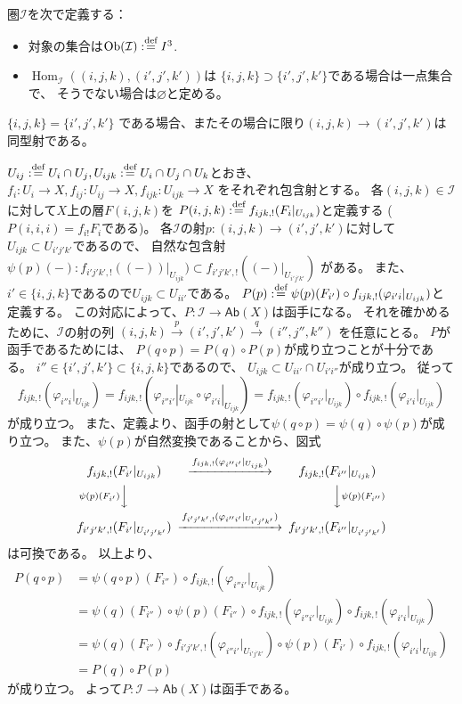 \documentclass[uplatex,dvipdfmx]{jsarticle}
\makeatletter
\theoremstyle{definition}
\renewenvironment{proof}[1][\proofname]{
  \pushQED{\qed}%
  \normalfont \topsep6\p@\@plus6\p@\relax
  \trivlist
  \item[\hskip\labelsep
    #1\@addpunct{\textbf{.}}]\ignorespaces
}{%
  \popQED\endtrivlist\@endpefalse
}
\providecommand{\proofname}{証明}
\DeclareMathOperator{\Hom}{\mathrm{Hom}}
\newcommand{\Ab}{\mathsf{Ab}}
\newcommand\mcI{\mathcal{I}}
\renewcommand{\emptyset}{\varnothing}
\def\dfn{:\overset{\mbox{{\scriptsize def}}}{=}}
\makeatother
\begin{document}
\begin{proof}
  圏\(\mcI\)を次で定義する：
  \begin{itemize}
    \item
    対象の集合は\(\mathrm{Ob}(\mcI) \dfn I^3\).
    \item
    \(\Hom_{\mcI}((i,j,k),(i',j',k'))\)は
    \(\{i,j,k\} \supset \{i',j',k'\}\)である場合は一点集合で、
    そうでない場合は\(\emptyset\)と定める。
  \end{itemize}
  \(\{i,j,k\} = \{i',j',k'\}\)
  である場合、またその場合に限り\((i,j,k)\to (i',j',k')\)は同型射である。

  \(U_{ij}\dfn U_i\cap U_j, U_{ijk}\dfn U_i\cap U_j\cap U_k\)とおき、
  \(f_i:U_i\to X, f_{ij}:U_{ij} \to X, f_{ijk}:U_{ijk}\to X\)
  をそれぞれ包含射とする。
  各\((i,j,k)\in \mcI\)に対して\(X\)上の層\(F(i,j,k)\)を
  \(P(i,j,k)\dfn f_{ijk,!}(F_i|_{U_{ijk}})\)と定義する
  (\(P(i,i,i) = f_{i!}F_i\)である)。
  各\(\mcI\)の射\(p:(i,j,k)\to (i',j',k')\)に対して
  \(U_{ijk}\subset U_{i'j'k'}\)であるので、
  自然な包含射
  \(\psi(p)(-):f_{i'j'k',!}((-))|_{U_{ijk}}) \subset
  f_{i'j'k',!}((-)|_{U_{i'j'k'}})\)
  がある。
  また、\(i'\in \{i,j,k\}\)であるので\(U_{ijk}\subset U_{ii'}\)である。
  \(P(p)\dfn \psi(p)(F_{i'})\circ f_{ijk,!}(\varphi_{i'i}|_{U_{ijk}})\)と定義する。
  この対応によって、\(P:\mcI\to \Ab(X)\)は函手になる。
  それを確かめるために、\(\mcI\)の射の列
  \((i,j,k)\xrightarrow{p}(i',j',k')\xrightarrow{q}(i'',j'',k'')\)
  を任意にとる。
  \(P\)が函手であるためには、
  \(P(q\circ p) = P(q)\circ P(p)\)が成り立つことが十分である。
  \(i''\in \{i',j',k'\}\subset \{i,j,k\}\)であるので、
  \(U_{ijk}\subset U_{ii'}\cap U_{i'i''}\)が成り立つ。
  従って
  \[
  f_{ijk,!}(\varphi_{i''i}|_{U_{ijk}})
  = f_{ijk,!}(\varphi_{i''i'}|_{U_{ijk}}\circ \varphi_{i'i}|_{U_{ijk}})
  = f_{ijk,!}(\varphi_{i''i'}|_{U_{ijk}})\circ f_{ijk,!}(\varphi_{i'i}|_{U_{ijk}})
  \]
  が成り立つ。
  また、定義より、函手の射として\(\psi(q\circ p)=\psi(q)\circ \psi(p)\)が成り立つ。
  また、\(\psi(p)\)が自然変換であることから、図式
  \[
  \begin{CD}
    f_{ijk,!}(F_{i'}|_{U_{ijk}})
    @> f_{ijk,!}(\varphi_{i''i'}|_{U_{ijk}})>>
    f_{ijk,!}(F_{i''}|_{U_{ijk}}) \\
    @V{\psi(p)(F_{i'})}VV
    @VV{\psi(p)(F_{i''})}V \\
    f_{i'j'k',!}(F_{i'}|_{U_{i'j'k'}})
    @> f_{i'j'k',!}(\varphi_{i''i'}|_{U_{i'j'k'}})>>
    f_{i'j'k',!}(F_{i''}|_{U_{i'j'k'}})
  \end{CD}
  \]
  は可換である。
  以上より、
  \begin{align*}
    P(q\circ p)
    &= \psi(q\circ p)(F_{i''}) \circ f_{ijk,!}(\varphi_{i''i'}|_{U_{ijk}}) \\
    &= \psi(q)(F_{i''}) \circ \psi(p)(F_{i''}) \circ
    f_{ijk,!}(\varphi_{i''i'}|_{U_{ijk}})\circ f_{ijk,!}(\varphi_{i'i}|_{U_{ijk}}) \\
    &= \psi(q)(F_{i''}) \circ f_{i'j'k',!}(\varphi_{i''i'}|_{U_{i'j'k'}})
    \circ \psi(p)(F_{i'}) \circ f_{ijk,!}(\varphi_{i'i}|_{U_{ijk}}) \\
    &= P(q)\circ P(p)
  \end{align*}
  が成り立つ。
  よって\(P:\mcI\to \Ab(X)\)は函手である。


\end{proof}
\end{document}
